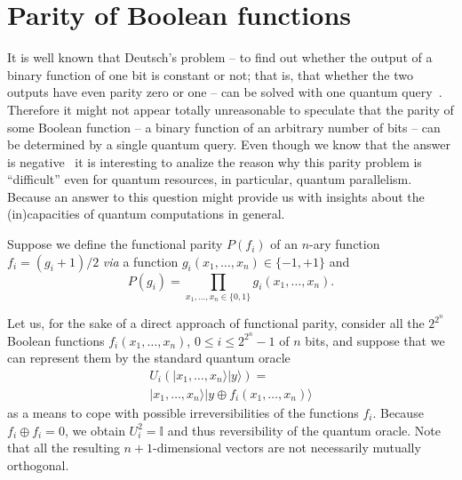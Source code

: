 \documentclass[%
 12pt,
 reprint,
  twocolumn,
 showpacs,
 showkeys,
 preprintnumbers,
 amsmath,amssymb,
 aps,
  pra,
  longbibliography,
 ]{revtex4-1}
\begin{document}
\section{Parity of Boolean functions}

It is well known that Deutsch's problem -- to find out whether the output of a binary function of one bit
is constant or not; that is, that whether the two outputs have even parity zero or one --
can be solved with one quantum query~\cite{nielsen-book,mermin-07}.
Therefore it might not appear totally unreasonable to
speculate that the parity of some Boolean function -- a binary function of an arbitrary number of bits --
can be determined by a single quantum query.
Even though we know that the answer is negative~\cite{Farhi-98}
it is interesting to analize the reason why this parity problem is ``difficult''
even for quantum resources, in particular, quantum parallelism.
Because an answer to this question might provide us with insights about
the (in)capacities of quantum computations in general.

Suppose we define the functional parity $P(f_i)$ of an $n$-ary function $f_i = (g_i +1)/2$
{\it via} a function $g_i (  x_1,\ldots , x_n)\in \{-1,+1\}$ and
\begin{equation}
P(g_i) = \prod_{x_1,\ldots,x_n  \in \{0,1\}} g_i (  x_1,\ldots , x_n).
\end{equation}

Let us, for the sake of a direct approach of functional parity,
consider all the $2^{2^n}$ Boolean functions $f_i(  x_1,\ldots , x_n )$,
$0\le i \le 2^{2^n}-1$ of $n$ bits, and suppose that we can represent them by the
standard quantum oracle
\begin{equation}
\begin{split}
U_i( \vert x_1,\ldots , x_n\rangle \vert y \rangle ) =\\
\vert x_1,\ldots , x_n\rangle \vert y\oplus f_i(   x_1,\ldots , x_n)\rangle
\end{split}
\end{equation}
as a means to cope with possible irreversibilities of the functions $f_i$.
Because $f_i\oplus f_i = 0$, we obtain $U_i^2 = \mathbb{I}$ and thus reversibility of the quantum oracle.
Note that all the resulting $n+1$-dimensional vectors are not necessarily mutually orthogonal.
\end{document}
